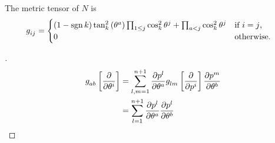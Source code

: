 \documentclass[stu, babel, american, biblatex, a4paper, leqno, draftall]{apa7}
\begin{document}
\begin{lemma}\label{M:MetricTensor}
    The metric tensor of $N$ is
    \begin{align*}
        \tensor{g}{_i_j} & =
        \begin{cases}
            \left(1-\sign{k}\right)
            \tan_k^2\left(\tensor{\theta}{^a}\right)
            \prod_{1\le j}{\cos_k^2\tensor{\theta}{^j}}
            +
            \prod_{a<j}{\cos_k^2\tensor{\theta}{^j}} & \text{if $i=j$,}  \\
            0                                        & \text{otherwise.} \\
        \end{cases}
    \end{align*}
\end{lemma}
\begin{proof}[]
    \begin{align*}
        \tensor{g}{_a_b}\left[\frac{\partial}{\partial\tensor{\theta}{^i}}\right]
         & = \sum_{l,m=1}^{n+1}{
        \frac{\partial{\tensor{p}{^l}}}{\partial{\tensor{\theta}{^a}}}
        \tensor{g}{_l_m}\left[\frac{\partial}{\partial\tensor{p}{^i}}\right]
        \frac{\partial{\tensor{p}{^m}}}{\partial{\tensor{\theta}{^b}}}
        }                        \\
         & = \sum_{l=1}^{n+1}{
        \frac{\partial{\tensor{p}{^l}}}{\partial{\tensor{\theta}{^a}}}
        \frac{\partial{\tensor{p}{^l}}}{\partial{\tensor{\theta}{^b}}}
        }
    \end{align*}


\end{proof}
\end{document}
